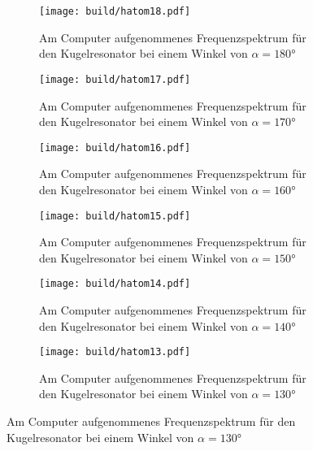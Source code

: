 \begin{figure}
  \centering
  \begin{subfigure}{0.49\textwidth}
    \centering
    \texttt{[image: build/hatom18.pdf]}
    \caption{Am Computer aufgenommenes Frequenzspektrum für den Kugelresonator bei
    einem Winkel von $\alpha=180°$}
    \label{fig:hatom18}
  \end{subfigure}
  \begin{subfigure}{0.49\textwidth}
    \centering
    \texttt{[image: build/hatom17.pdf]}
    \caption{Am Computer aufgenommenes Frequenzspektrum für den Kugelresonator bei
    einem Winkel von $\alpha=170°$}
    \label{fig:hatom17}
  \end{subfigure}
  \begin{subfigure}{0.49\textwidth}
    \centering
    \texttt{[image: build/hatom16.pdf]}
    \caption{Am Computer aufgenommenes Frequenzspektrum für den Kugelresonator bei
    einem Winkel von $\alpha=160°$}
    \label{fig:hatom16}
  \end{subfigure}
  \begin{subfigure}{0.49\textwidth}
    \centering
    \texttt{[image: build/hatom15.pdf]}
    \caption{Am Computer aufgenommenes Frequenzspektrum für den Kugelresonator bei
    einem Winkel von $\alpha=150°$}
    \label{fig:hatom15}
  \end{subfigure}
  \begin{subfigure}{0.49\textwidth}
    \centering
    \texttt{[image: build/hatom14.pdf]}
    \caption{Am Computer aufgenommenes Frequenzspektrum für den Kugelresonator bei
    einem Winkel von $\alpha=140°$}
    \label{fig:hatom14}
  \end{subfigure}
  \begin{subfigure}{0.49\textwidth}
    \centering
    \texttt{[image: build/hatom13.pdf]}
    \caption{Am Computer aufgenommenes Frequenzspektrum für den Kugelresonator bei
    einem Winkel von $\alpha=130°$}
    \label{fig:hatom13}
  \end{subfigure}
\end{figure}

